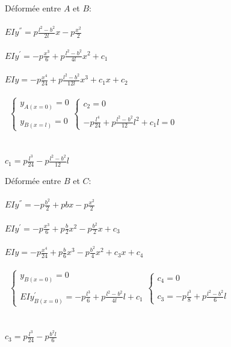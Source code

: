 \documentclass[a4paper]{article}
\begin{document}
~\\
~\\
~\\
\begin{minipage}[t]{9.5cm}
Déformée entre $A$ et $B$:\\
~\\
$EIy^{''} = p\frac{l^2-b^2}{2l}x - p\frac{x^2}{2}$\\
~\\
$EIy^{'} = -p\frac{x^3}{6} + p\frac{l^2-b^2}{4l}x^2 + c_1$\\
~\\
$EIy = -p\frac{x^4}{24} + p\frac{l^2-b^2}{12l}x^3 + c_1x + c_2$\\
~\\
~$
\begin{cases}
  y_{A(x=0)} = 0\\~\\
  y_{B(x=l)} = 0
\end{cases}
\begin{cases}
  c_2 = 0\\~\\
  -p\frac{l^4}{24} + p\frac{l^2-b^2}{12}l^2 + c_1l = 0
\end{cases}
$\\
~\\
~\\
$c_1 = p\frac{l^3}{24} - p\frac{l^2-b^2}{12}l$\\
\end{minipage}
\begin{minipage}[t]{9.5cm}
Déformée entre $B$ et $C$:\\
~\\
$EIy^{''} =
- p\frac{b^2}{2}
+ pbx
- p\frac{x^2}{2}
$\\
~\\
$EIy^{'} =
- p\frac{x^3}{6}
+ p\frac{b}{2}x^2
- p\frac{b^2}{2}x
+ c_3
$\\
~\\
$EIy =
- p\frac{x^4}{24}
+ p\frac{b}{6}x^3
- p\frac{b^2}{4}x^2
+ c_3x
+ c_4
$\\
~\\
~$
\begin{cases}
  y_{B(x=0)} = 0\\~\\
  EIy^{'}_{B(x=0)} = -p\frac{l^3}{6} + p\frac{l^2-b^2}{4l}l + c_1
\end{cases}
\begin{cases}
  c_4 = 0\\~\\
  c_3 = -p\frac{l^3}{8} + p\frac{l^2-b^2}{6}l
\end{cases}
$\\
~\\
~\\
$c_3 = p\frac{l^3}{24} - p\frac{b^2l}{6}$
\end{minipage}
\end{document}
